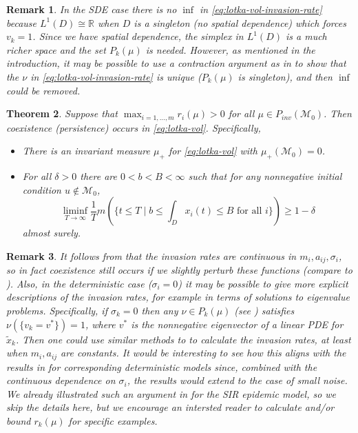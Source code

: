 \documentclass[final]{amsart}
\newtheorem{thm}{Theorem}
\newtheorem{rem}[thm]{Remark}
\numberwithin{thm}{section}
\numberwithin{equation}{section}
\newcommand{\mcM}{\mathcal{M}}
\newcommand{\R}{\mathbb{R}}
\begin{document}
\begin{rem}
    In the SDE case there is no $\inf$ in \eqref{eq:lotka-vol-invasion-rate} because $L^1(D) \cong \R$ when $D$ is a singleton (no spatial dependence) which forces $v_k = 1$. Since we have spatial dependence, the simplex in $L^1(D)$ is a much richer space and the set $P_k(\mu)$ is needed. However, as mentioned in the introduction, it may be possible to use a contraction argument as in \cite{BenaimLobrySari25, Bushell86, cohenfausti2024} to show that the $\nu$ in \eqref{eq:lotka-vol-invasion-rate} is unique ($P_k(\mu)$ is singleton), and then 
    $\inf$ could be removed. 
\end{rem}

    
    



\begin{thm}\label{lotka-volterra-main}
Suppose that $\max_{i=1,\dots,m} r_i(\mu) > 0$ for all $\mu \in P_{inv}(\mcM_0)$. Then coexistence (persistence) occurs in \eqref{eq:lotka-vol}. Specifically,
\begin{itemize}
    \item There is an invariant measure $\mu_+$ for \eqref{eq:lotka-vol} with $\mu_+(\mcM_0) = 0$.
    \item For all $\delta > 0$ there are $0 < b < B < \infty$ such that for any nonnegative initial condition $u \notin \mcM_0$,
    $$\liminf_{T \to \infty} \frac{1}{T}m(\{t \leq T \mid b \leq \int_D x_i(t) \leq B \text{ for all } i\}) \geq 1 - \delta$$ almost surely.
\end{itemize}
\end{thm}

\begin{rem}
    It follows from  that the invasion rates are continuous in $m_i,a_{ij},\sigma_i$, so in fact coexistence still occurs if we slightly perturb these functions (compare to \cite[Theorem 2.8]{ecologicalGeneral}). Also, in the deterministic case ($\sigma_i = 0$) it may be possible to give more explicit descriptions of the invasion rates, for example in terms of solutions to eigenvalue problems. Specifically, if $\sigma_k = 0$ then any $\nu \in P_k(\mu)$ (see )  satisfies $\nu(\{v_k = v^*\}) = 1$, where $v^*$ is the nonnegative eigenvector of a linear PDE for $\tilde x_k$. Then one could use similar methods to \cite[Section 5.5.]{ecologicalGeneral} to calculate the invasion rates, at least when $m_i,a_{ij}$ are constants. It would be interesting to see how this aligns  with the results in \cite{deterministic-lotka-volterra} for corresponding deterministic models since, combined with the continuous dependence on $\sigma_i$, the results would extend to the case of small noise. We already illustrated such an argument in  for the SIR epidemic model, so we skip the details here, but we encourage an intersted reader to calculate and/or bound $r_k(\mu)$ for  specific examples.
\end{rem}
\end{document}
